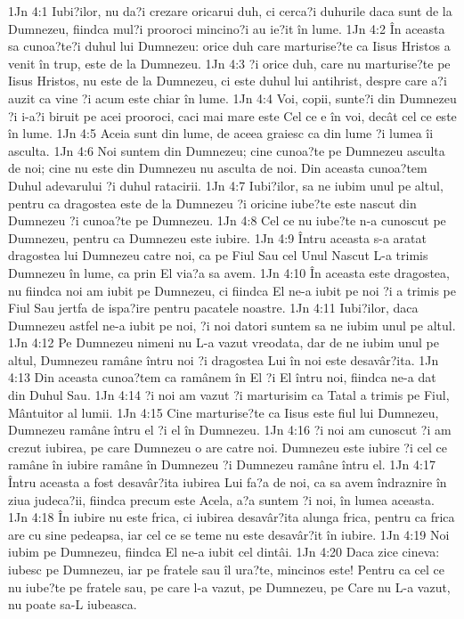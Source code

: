 1Jn 4:1  Iubi?ilor, nu da?i crezare oricarui duh, ci cerca?i duhurile daca sunt de la Dumnezeu, fiindca mul?i prooroci mincino?i au ie?it în lume.
1Jn 4:2  În aceasta sa cunoa?te?i duhul lui Dumnezeu: orice duh care marturise?te ca Iisus Hristos a venit în trup, este de la Dumnezeu.
1Jn 4:3  ?i orice duh, care nu marturise?te pe Iisus Hristos, nu este de la Dumnezeu, ci este duhul lui antihrist, despre care a?i auzit ca vine ?i acum este chiar în lume.
1Jn 4:4  Voi, copii, sunte?i din Dumnezeu ?i i-a?i biruit pe acei prooroci, caci mai mare este Cel ce e în voi, decât cel ce este în lume.
1Jn 4:5  Aceia sunt din lume, de aceea graiesc ca din lume ?i lumea îi asculta.
1Jn 4:6  Noi suntem din Dumnezeu; cine cunoa?te pe Dumnezeu asculta de noi; cine nu este din Dumnezeu nu asculta de noi. Din aceasta cunoa?tem Duhul adevarului ?i duhul ratacirii.
1Jn 4:7  Iubi?ilor, sa ne iubim unul pe altul, pentru ca dragostea este de la Dumnezeu ?i oricine iube?te este nascut din Dumnezeu ?i cunoa?te pe Dumnezeu.
1Jn 4:8  Cel ce nu iube?te n-a cunoscut pe Dumnezeu, pentru ca Dumnezeu este iubire.
1Jn 4:9  Întru aceasta s-a aratat dragostea lui Dumnezeu catre noi, ca pe Fiul Sau cel Unul Nascut L-a trimis Dumnezeu în lume, ca prin El via?a sa avem.
1Jn 4:10  În aceasta este dragostea, nu fiindca noi am iubit pe Dumnezeu, ci fiindca El ne-a iubit pe noi ?i a trimis pe Fiul Sau jertfa de ispa?ire pentru pacatele noastre.
1Jn 4:11  Iubi?ilor, daca Dumnezeu astfel ne-a iubit pe noi, ?i noi datori suntem sa ne iubim unul pe altul.
1Jn 4:12  Pe Dumnezeu nimeni nu L-a vazut vreodata, dar de ne iubim unul pe altul, Dumnezeu ramâne întru noi ?i dragostea Lui în noi este desavâr?ita.
1Jn 4:13  Din aceasta cunoa?tem ca ramânem în El ?i El întru noi, fiindca ne-a dat din Duhul Sau.
1Jn 4:14  ?i noi am vazut ?i marturisim ca Tatal a trimis pe Fiul, Mântuitor al lumii.
1Jn 4:15  Cine marturise?te ca Iisus este fiul lui Dumnezeu, Dumnezeu ramâne întru el ?i el în Dumnezeu.
1Jn 4:16  ?i noi am cunoscut ?i am crezut iubirea, pe care Dumnezeu o are catre noi. Dumnezeu este iubire ?i cel ce ramâne în iubire ramâne în Dumnezeu ?i Dumnezeu ramâne întru el.
1Jn 4:17  Întru aceasta a fost desavâr?ita iubirea Lui fa?a de noi, ca sa avem îndraznire în ziua judeca?ii, fiindca precum este Acela, a?a suntem ?i noi, în lumea aceasta.
1Jn 4:18  În iubire nu este frica, ci iubirea desavâr?ita alunga frica, pentru ca frica are cu sine pedeapsa, iar cel ce se teme nu este desavâr?it în iubire.
1Jn 4:19  Noi iubim pe Dumnezeu, fiindca El ne-a iubit cel dintâi.
1Jn 4:20  Daca zice cineva: iubesc pe Dumnezeu, iar pe fratele sau îl ura?te, mincinos este! Pentru ca cel ce nu iube?te pe fratele sau, pe care l-a vazut, pe Dumnezeu, pe Care nu L-a vazut, nu poate sa-L iubeasca.
